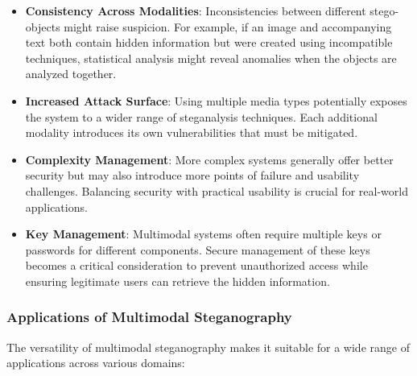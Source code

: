 \documentclass[12pt, a4paper, oneside]{book}
\begin{document}
\begin{itemize}[leftmargin=*]
    \item \textbf{Consistency Across Modalities}: Inconsistencies between different stego-objects might raise suspicion. For example, if an image and accompanying text both contain hidden information but were created using incompatible techniques, statistical analysis might reveal anomalies when the objects are analyzed together.

    \item \textbf{Increased Attack Surface}: Using multiple media types potentially exposes the system to a wider range of steganalysis techniques. Each additional modality introduces its own vulnerabilities that must be mitigated.

    \item \textbf{Complexity Management}: More complex systems generally offer better security but may also introduce more points of failure and usability challenges. Balancing security with practical usability is crucial for real-world applications.

    \item \textbf{Key Management}: Multimodal systems often require multiple keys or passwords for different components. Secure management of these keys becomes a critical consideration to prevent unauthorized access while ensuring legitimate users can retrieve the hidden information.
\end{itemize}

\subsubsection{Applications of Multimodal Steganography}
The versatility of multimodal steganography makes it suitable for a wide range of applications across various domains:
\end{document}
